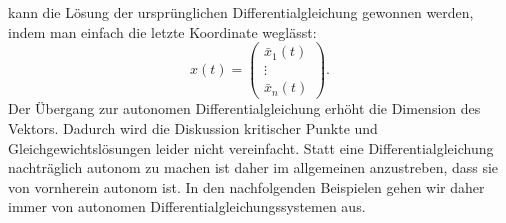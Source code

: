 kann die Lösung der ursprünglichen Differentialgleichung gewonnen
werden, indem man einfach die letzte Koordinate weglässt:
\[
x(t)
=
\begin{pmatrix}
\bar x_1(t) \\ \vdots \\ \bar x_n(t)
\end{pmatrix}.
\]
Der Übergang zur autonomen Differentialgleichung erhöht die Dimension
des Vektors.
Dadurch wird die Diskussion kritischer Punkte und Gleichgewichtslösungen
leider nicht vereinfacht.
Statt eine Differentialgleichung nachträglich autonom zu machen
ist daher im allgemeinen anzustreben, dass sie von vornherein
autonom ist.
In den nachfolgenden Beispielen gehen wir daher immer von autonomen
Differentialgleichungssystemen aus.




